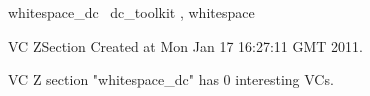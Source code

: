 \documentclass{article}
\begin{document}

\begin{zsection}
	 \SECTION whitespace\_dc \parents~dc\_toolkit , whitespace
\end{zsection}

\newcommand{\appliesTo}{\zbinop{appliesTo}} 
\newcommand{\appliesToNofix}{\zpreop{appliesToNofix}} 

VC ZSection Created at Mon Jan 17 16:27:11 GMT 2011.



 VC Z section "whitespace_dc" has $0$ interesting VCs.



\end{document}
